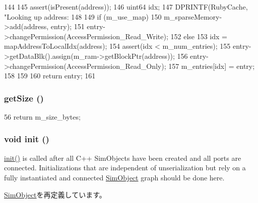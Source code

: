 \begin{DoxyCode}
144 {
145     assert(isPresent(address));
146     uint64 idx;
147     DPRINTF(RubyCache, "Looking up address: %
148 
149     if (m_use_map) {
150         m_sparseMemory->add(address, entry);
151         entry->changePermission(AccessPermission_Read_Write);
152     } else {
153         idx = mapAddressToLocalIdx(address);
154         assert(idx < m_num_entries);
155         entry->getDataBlk().assign(m_ram->getBlockPtr(address));
156         entry->changePermission(AccessPermission_Read_Only);
157         m_entries[idx] = entry;
158     }
159 
160     return entry;
161 }
\end{DoxyCode}
\hypertarget{classDirectoryMemory_a8e981cbeb9445bf4b68f04489d0ec5e5}{
\subsubsection[{getSize}]{ getSize ()}}
\label{classDirectoryMemory_a8e981cbeb9445bf4b68f04489d0ec5e5}



\begin{DoxyCode}
56 { return m_size_bytes; }
\end{DoxyCode}
\hypertarget{classDirectoryMemory_a02fd73d861ef2e4aabb38c0c9ff82947}{
\subsubsection[{init}]{\setlength{\rightskip}{0pt plus 5cm}void init ()}}
\label{classDirectoryMemory_a02fd73d861ef2e4aabb38c0c9ff82947}
\hyperlink{classDirectoryMemory_a02fd73d861ef2e4aabb38c0c9ff82947}{init()} is called after all C++ SimObjects have been created and all ports are connected. Initializations that are independent of unserialization but rely on a fully instantiated and connected \hyperlink{classSimObject}{SimObject} graph should be done here. 

\hyperlink{classSimObject_a02fd73d861ef2e4aabb38c0c9ff82947}{SimObject}を再定義しています。


